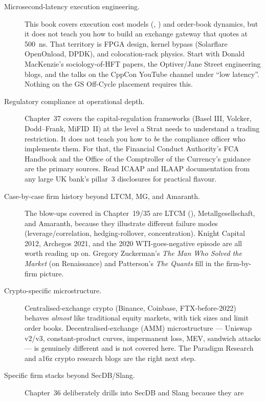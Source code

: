 \begin{description}
  \item[Microsecond-latency execution engineering.] This book covers
    execution cost models (\citealp{almgren2000optimal},
    \citealp{almgren2005direct}) and order-book dynamics, but it does
    not teach you how to build an exchange gateway that quotes at
    500~ns. That territory is FPGA design, kernel bypass (Solarflare
    OpenOnload, DPDK), and colocation-rack physics. Start with
    Donald MacKenzie's sociology-of-HFT papers, the Optiver/Jane
    Street engineering blogs, and the talks on the CppCon YouTube
    channel under ``low latency''. Nothing on the GS Off-Cycle
    placement requires this.
  \item[Regulatory compliance at operational depth.] Chapter~37
    covers the capital-regulation frameworks (Basel III,
    Volcker, Dodd--Frank, MiFID~II) at the level a Strat needs to
    understand a trading restriction. It does not teach you how
    to \emph{be} the compliance officer who implements them. For
    that, the Financial Conduct Authority's FCA Handbook and the
    Office of the Comptroller of the Currency's guidance are the
    primary sources. Read ICAAP and ILAAP documentation from any
    large UK bank's pillar~3 disclosures for practical flavour.
  \item[Case-by-case firm history beyond LTCM, MG, and Amaranth.]
    The blow-ups covered in Chapter~19/35 are LTCM
    (\citealp{lowenstein2000ltcm}), Metallgesellschaft, and
    Amaranth, because they illustrate different failure modes
    (leverage/correlation, hedging-rollover, concentration).
    Knight Capital 2012, Archegos 2021, and the 2020
    WTI-goes-negative episode are all worth reading up on. Gregory
    Zuckerman's \emph{The Man Who Solved the Market} (on Renaissance)
    and Patterson's \emph{The Quants} fill in the firm-by-firm
    picture.
  \item[Crypto-specific microstructure.] Centralised-exchange crypto
    (Binance, Coinbase, FTX-before-2022) behaves \emph{almost} like
    traditional equity markets, with tick sizes and limit order
    books. Decentralised-exchange (AMM) microstructure --- Uniswap
    v2/v3, constant-product curves, impermanent loss, MEV, sandwich
    attacks --- is genuinely different and is not covered here. The
    Paradigm Research and a16z crypto research blogs are the right
    next step.
  \item[Specific firm stacks beyond SecDB/Slang.] Chapter~36
    deliberately drills into SecDB and Slang because they are

\end{description}
